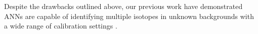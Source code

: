 Despite the drawbacks outlined above, our previous work have demonstrated ANNs are capable of identifying multiple isotopes in unknown backgrounds with a wide range of calibration settings \cite{kamudaThesis2017,kamuda2017,kamuda2018}.















